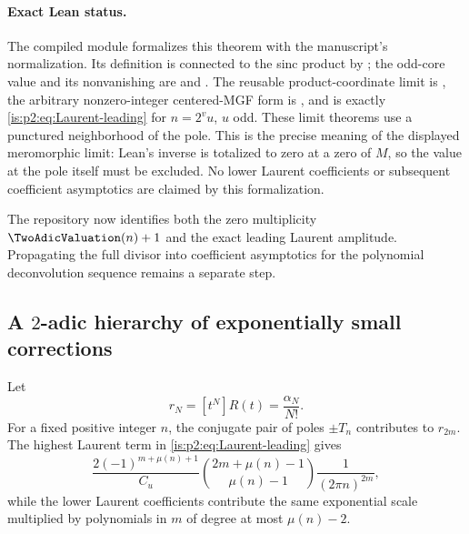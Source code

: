 \paragraph{Exact Lean status.}
The compiled module  formalizes
this theorem with the manuscript's normalization.  Its definition
 is connected to the sinc product by
; the odd-core value
and its nonvanishing are
 and
.  The reusable
product-coordinate limit is
, the arbitrary
nonzero-integer centered-MGF form is
, and
 is exactly
\eqref{is:p2:eq:Laurent-leading} for $n=2^v u$, $u$ odd.  These limit
theorems use a punctured neighborhood of the pole.  This is the precise
meaning of the displayed meromorphic limit: Lean's inverse is totalized to
zero at a zero of $M$, so the value at the pole itself must be excluded.
No lower Laurent coefficients or subsequent coefficient asymptotics are
claimed by this formalization.

\begin{remark}
The repository now identifies both the zero multiplicity
$\TwoAdicValuation(n)+1$ and the exact leading Laurent amplitude.  Propagating
the full divisor into coefficient asymptotics for the polynomial
deconvolution sequence remains a separate step.
\end{remark}

\subsection{A \texorpdfstring{$2$}{2}-adic hierarchy of exponentially small corrections}

Let
\begin{equation}
 r_N=[t^N]R(t)=\frac{\alpha_N}{N!}.
 \label{is:p2:eq:rN}
\end{equation}
For a fixed positive integer $n$, the conjugate pair of poles $\pm T_n$ contributes to $r_{2m}$.
The highest Laurent term in \eqref{is:p2:eq:Laurent-leading} gives
\begin{equation}
 \frac{2(-1)^{m+\mu(n)+1}}{C_u}
 \binom{2m+\mu(n)-1}{\mu(n)-1}
 \frac1{(2\pi n)^{2m}},
 \label{is:p2:eq:general-shell-leading}
\end{equation}
while the lower Laurent coefficients contribute the same exponential scale multiplied by
polynomials in $m$ of degree at most $\mu(n)-2$.

